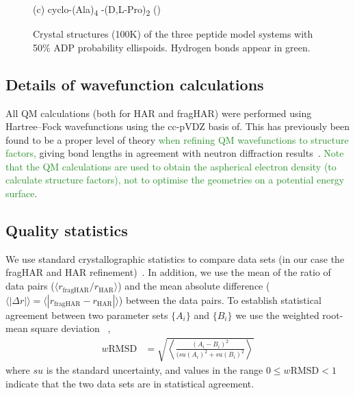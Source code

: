 \documentclass[preprint,dvipsnames]{iucr}              %
\newcommand{\s}[1]{{\textrm{#1}}}
\newcommand{\changed}[1]{\textcolor{ForestGreen}{#1}}
\begin{document}
\begin{figure}
\begin{minipage}[t]{0.36\linewidth}
 (c) cyclo-(Ala)\textsubscript{4} -(D,L-Pro)\textsubscript{2} ()
 \end{minipage}%
 \caption{Crystal structures (100K) of the three peptide model systems 
 with 50\% ADP probability ellispoids. Hydrogen bonds appear in green. }
  \label{fig_model_systems}
\end{figure}




\subsection{Details of wavefunction calculations}

All QM calculations (both for HAR and fragHAR) were performed using 
Hartree--Fock wavefunctions using the cc-pVDZ basis of\cite{dunning1989gaussian}.   
This has previously been found to be a proper level of theory 
\changed{when refining QM wavefunctions to structure factors,}
giving  bond lengths in agreement with neutron
diffraction results~\cite{capelli2014hirshfeld,fugel2018probing}. 
\changed{Note that the QM calculations are used to obtain 
the aspherical electron density (to calculate  structure factors), 
not to optimise the geometries on a potential energy surface}.



\subsection{Quality statistics}

We use standard crystallographic statistics to compare data sets 
(in our case the fragHAR and HAR refinement)~\cite{schwarzenbach1995statistical}. 
In addition, we use the mean of the ratio of data pairs 
($\langle  r_\s{fragHAR}/r_\s{HAR}\rangle$) and the mean absolute 
difference ($\langle |\Delta r | \rangle = \langle |r_\s{fragHAR}-r_\s{HAR}| \rangle$) 
between the data pairs. To establish statistical agreement
between two parameter sets $\{ A_i \}$  and $\{ B_i \}$ we use 
the weighted root-mean square deviation
~\cite{capelli2014hirshfeld,schwarzenbach1995statistical},
\begin{align}
w\s{RMSD} & = \sqrt{\left< \frac{(A_i - B_i)^2}{(su(A_i)^2 +su(B_i)^2} \right>}
\label{eq_wrmsd}
\end{align}
where $su$ is the standard uncertainty, and values in the range $0 \leq w\s{RMSD} < 1$ 
indicate that the two data sets are in statistical agreement.
\end{document}
